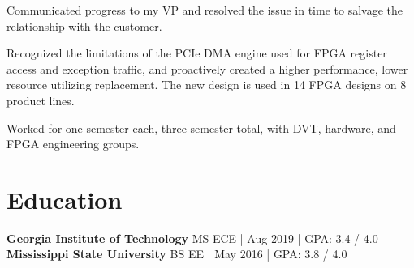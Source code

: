 \documentclass[8pt]{deedy-resume-reversed}
\begin{document}
\begin{minipage}[t]{1.0\textwidth}
\begin{tightemize}
Communicated progress to my VP and resolved the issue in time to salvage the relationship with the customer.
\item Recognized the limitations of the PCIe DMA engine used for FPGA register access and exception traffic,
and proactively created a higher performance, lower resource utilizing replacement. The new design is used in 14 FPGA designs on 8 product lines.
\end{tightemize}
\sectionsep

\begin{tightemize}
\item Worked for one semester each, three semester total, with DVT, hardware, and FPGA engineering groups.
\end{tightemize}
\sectionsep



\section{Education}
\textbf{Georgia Institute of Technology} MS ECE | Aug 2019 | GPA: 3.4 / 4.0 \\
\textbf{Mississippi State University} BS EE | May 2016 | GPA: 3.8 / 4.0 \\
\sectionsep

\end{minipage}
\end{document}
